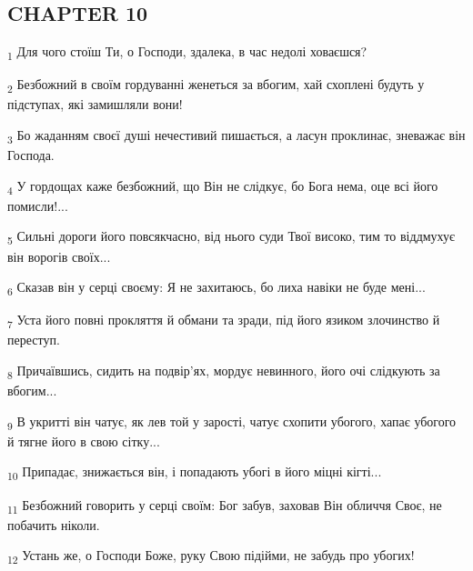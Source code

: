 \subsection{CHAPTER 10}
\begin{tcolorbox}
\textsubscript{1} Для чого стоїш Ти, о Господи, здалека, в час недолі ховаєшся?
\end{tcolorbox}
\begin{tcolorbox}
\textsubscript{2} Безбожний в своїм гордуванні женеться за вбогим, хай схоплені будуть у підступах, які замишляли вони!
\end{tcolorbox}
\begin{tcolorbox}
\textsubscript{3} Бо жаданням своєї душі нечестивий пишається, а ласун проклинає, зневажає він Господа.
\end{tcolorbox}
\begin{tcolorbox}
\textsubscript{4} У гордощах каже безбожний, що Він не слідкує, бо Бога нема, оце всі його помисли!...
\end{tcolorbox}
\begin{tcolorbox}
\textsubscript{5} Сильні дороги його повсякчасно, від нього суди Твої високо, тим то віддмухує він ворогів своїх...
\end{tcolorbox}
\begin{tcolorbox}
\textsubscript{6} Сказав він у серці своєму: Я не захитаюсь, бо лиха навіки не буде мені...
\end{tcolorbox}
\begin{tcolorbox}
\textsubscript{7} Уста його повні прокляття й обмани та зради, під його язиком злочинство й переступ.
\end{tcolorbox}
\begin{tcolorbox}
\textsubscript{8} Причаївшись, сидить на подвір'ях, мордує невинного, його очі слідкують за вбогим...
\end{tcolorbox}
\begin{tcolorbox}
\textsubscript{9} В укритті він чатує, як лев той у зарості, чатує схопити убогого, хапає убогого й тягне його в свою сітку...
\end{tcolorbox}
\begin{tcolorbox}
\textsubscript{10} Припадає, знижається він, і попадають убогі в його міцні кігті...
\end{tcolorbox}
\begin{tcolorbox}
\textsubscript{11} Безбожний говорить у серці своїм: Бог забув, заховав Він обличчя Своє, не побачить ніколи.
\end{tcolorbox}
\begin{tcolorbox}
\textsubscript{12} Устань же, о Господи Боже, руку Свою підійми, не забудь про убогих!
\end{tcolorbox}
